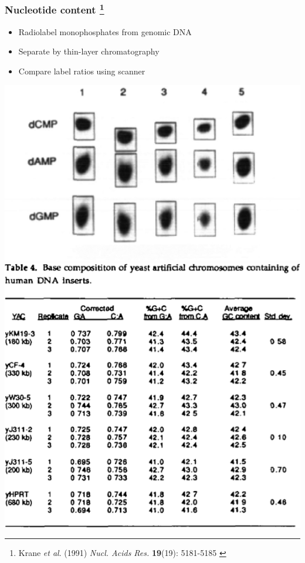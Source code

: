 %
\begin{frame}
  \frametitle{Nucleotide content
  \footnote{\tiny{Krane \textit{et al}. (1991) \textit{Nucl. Acids Res.} \textbf{19}(19): 5181-5185
}}
  }
  \begin{itemize}
    \item \textcolor{hutton_green}{Radiolabel monophosphates from genomic DNA}
    \item \textcolor{hutton_blue}{Separate by thin-layer chromatography}
    \item \textcolor{hutton_purple}{Compare label ratios using scanner}    
  \end{itemize}
  \begin{center}
    \includegraphics[height=0.4\textheight]{images/nucleotide_tlc}
    \includegraphics[height=0.4\textheight]{images/nucleotide_table}    
  \end{center}  
\end{frame}

